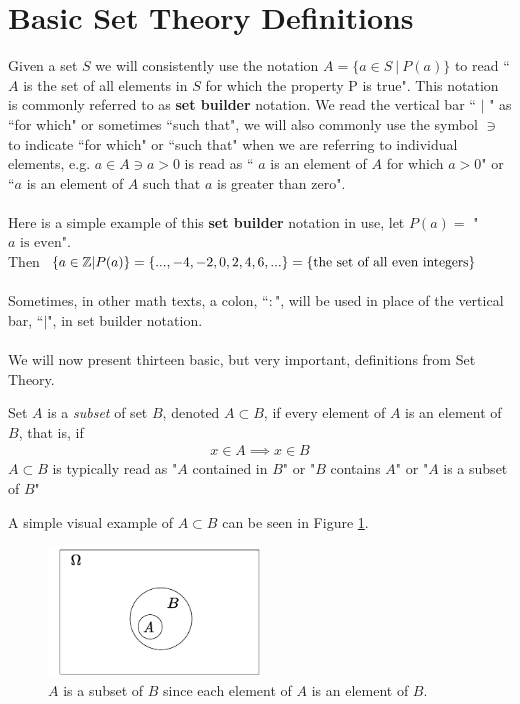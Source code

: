 \section{Basic Set Theory Definitions}
Given a set $S$ we will consistently use the notation $A=\{a\in S\ |\ P(a)\}$ to read `` $A$ is the set of all elements in $S$ for which the property P is true". This notation is commonly referred to as \textbf{set builder} notation. We read the vertical bar `` $|$ " as ``for which" or sometimes ``such that", we will also commonly use the symbol $\ni$ to indicate ``for which" or ``such that" when we are referring to individual elements, e.g. $a\in A \ni a>0$ is read as `` $a$ is an element of $A$ for which $a>0$" or ``$a$ is an element of $A$ such that $a$ is greater than zero". \\ \\
\noindent Here is a simple example of this \textbf{set builder} notation in use, let $P(a)=$ "$a \text{ is even}$". \\
Then $\{a\in {\mathbb{ Z}} | P(a)\} = \{...,-4,-2,0,2,4,6,...\} = \{ \text{the set of all even integers}\}$ \\ \\
Sometimes, in other math texts, a colon, ``$:$", will be used in place of the vertical bar, ``$|$", in set builder notation.\\ \\
\noindent We will now present thirteen basic, but very important, definitions from Set Theory. \newpage
\begin{definition}[Subset]\index{$\subset$}
Set $A$ is a \textit{subset} of set $B$, denoted $A\subset B$, if every element of $A$ is an element of $B$, that is, if
\begin{align}
    x\in A \implies x\in B \nonumber
\end{align}
$A\subset B$ is typically read as "$A$ contained in $B$" or "$B$ contains $A$" or "$A$ is a subset of $B$"
\end{definition}
A simple visual example of $A\subset B$ can be seen in Figure \ref{fig:Subset_example}.
\begin{figure}[h!]
    \centering
    \includegraphics[width=0.5\textwidth]{Figures/SUBSET_Example.pdf}
    \caption{$A$ is a subset of $B$ since each element of $A$ is an element of $B$.}
    \label{fig:Subset_example}
\end{figure}\\
